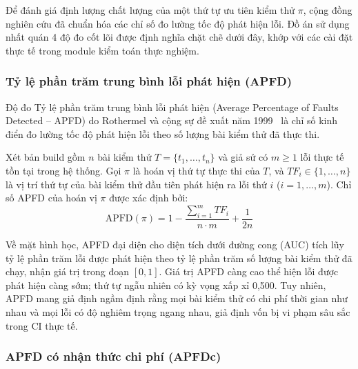 Để đánh giá định lượng chất lượng của một thứ tự ưu tiên kiểm thử $\pi$, cộng đồng nghiên cứu đã chuẩn hóa các chỉ số đo lường tốc độ phát hiện lỗi. Đồ án sử dụng nhất quán 4 độ đo cốt lõi được định nghĩa chặt chẽ dưới đây, khớp với các cài đặt thực tế trong module kiểm toán thực nghiệm.

\subsubsection{Tỷ lệ phần trăm trung bình lỗi phát hiện (APFD)}
\label{subsubsec:apfd_metric}

Độ đo Tỷ lệ phần trăm trung bình lỗi phát hiện (Average Percentage of Faults Detected -- APFD) do Rothermel và cộng sự đề xuất năm 1999~\cite{rothermel1999tcp} là chỉ số kinh điển đo lường tốc độ phát hiện lỗi theo số lượng bài kiểm thử đã thực thi.

\begin{dn}
\label{def:apfd_metric}
Xét bản build gồm $n$ bài kiểm thử $T = \{t_1, \dots, t_n\}$ và giả sử có $m \ge 1$ lỗi thực tế tồn tại trong hệ thống. Gọi $\pi$ là hoán vị thứ tự thực thi của $T$, và $TF_i \in \{1, \dots, n\}$ là vị trí thứ tự của bài kiểm thử đầu tiên phát hiện ra lỗi thứ $i$ ($i = 1, \dots, m$). Chỉ số APFD của hoán vị $\pi$ được xác định bởi:
\begin{equation}
\label{eq:apfd_formula}
\text{APFD}(\pi) = 1 - \frac{\sum_{i=1}^m TF_i}{n \cdot m} + \frac{1}{2n}
\end{equation}
\end{dn}

Về mặt hình học, APFD đại diện cho diện tích dưới đường cong (AUC) tích lũy tỷ lệ phần trăm lỗi được phát hiện theo tỷ lệ phần trăm số lượng bài kiểm thử đã chạy, nhận giá trị trong đoạn $[0, 1]$. Giá trị APFD càng cao thể hiện lỗi được phát hiện càng sớm; thứ tự ngẫu nhiên có kỳ vọng xấp xỉ 0,500. Tuy nhiên, APFD mang giả định ngầm định rằng mọi bài kiểm thử có chi phí thời gian như nhau và mọi lỗi có độ nghiêm trọng ngang nhau, giả định vốn bị vi phạm sâu sắc trong CI thực tế.

\subsubsection{APFD có nhận thức chi phí (APFDc)}
\label{subsubsec:apfdc_metric}


